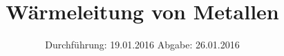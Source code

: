 

\subject{VERSUCH NUMMER V204}
\title{Wärmeleitung von Metallen}
\date{
  Durchführung: 19.01.2016
  \hspace{3em}
  Abgabe: 26.01.2016
}



\maketitle
\thispagestyle{empty}
\tableofcontents
\newpage







\printbibliography



